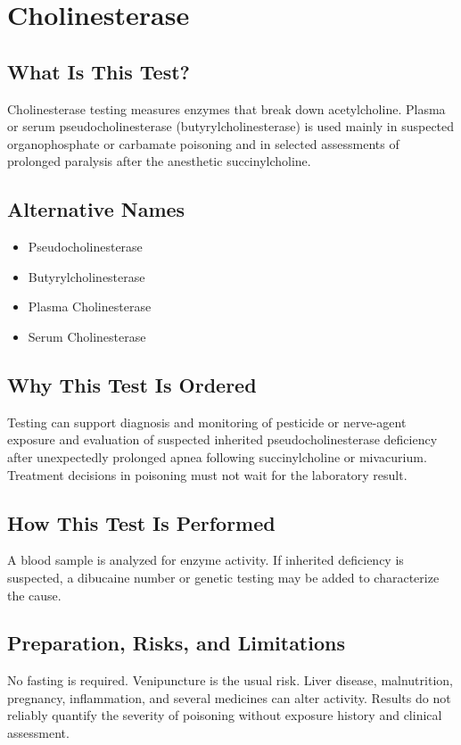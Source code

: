 \chapter{Cholinesterase}

\section*{What Is This Test?}
Cholinesterase testing measures enzymes that break down acetylcholine. Plasma or serum pseudocholinesterase (butyrylcholinesterase) is used mainly in suspected organophosphate or carbamate poisoning and in selected assessments of prolonged paralysis after the anesthetic succinylcholine.

\section*{Alternative Names}
\begin{itemize}
  \item Pseudocholinesterase
  \item Butyrylcholinesterase
  \item Plasma Cholinesterase
  \item Serum Cholinesterase
\end{itemize}
\section*{Why This Test Is Ordered}
Testing can support diagnosis and monitoring of pesticide or nerve-agent exposure and evaluation of suspected inherited pseudocholinesterase deficiency after unexpectedly prolonged apnea following succinylcholine or mivacurium. Treatment decisions in poisoning must not wait for the laboratory result.

\section*{How This Test Is Performed}
A blood sample is analyzed for enzyme activity. If inherited deficiency is suspected, a dibucaine number or genetic testing may be added to characterize the cause.

\section*{Preparation, Risks, and Limitations}
No fasting is required. Venipuncture is the usual risk. Liver disease, malnutrition, pregnancy, inflammation, and several medicines can alter activity. Results do not reliably quantify the severity of poisoning without exposure history and clinical assessment.

